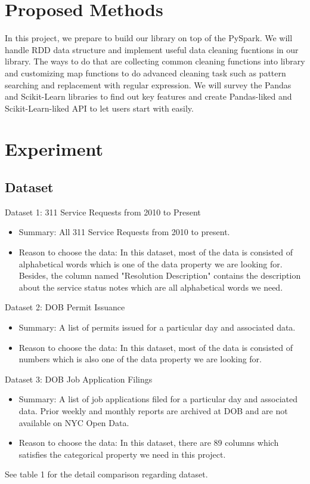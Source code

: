 \documentclass[sigconf]{acmart}
\begin{document}
\section{Proposed Methods}
In this project, we prepare to build our library on top of the PySpark\cite{pyspark, spark}. We will handle RDD data structure and implement useful data cleaning fucntions in our library. The ways to do that are collecting common cleaning functions into library and customizing map functions to do advanced cleaning task such as pattern searching and replacement with regular expression. We will survey the Pandas\cite{pandas} and Scikit-Learn\cite{scikit-learn} libraries to find out key features and create Pandas-liked and Scikit-Learn-liked API to let users start with easily.

\section{Experiment}
\subsection{Dataset}
Dataset 1: 311 Service Requests from 2010 to Present
\begin{itemize}
	\item{Summary: All 311 Service Requests from 2010 to present.}
	\item{Reason to choose the data: In this dataset, most of the data is consisted of alphabetical words which is one of the data property we are looking for. Besides, the column named "Resolution Description" contains the description about the service status notes which are all alphabetical words we need. }
\end{itemize}
Dataset 2: DOB Permit Issuance
\begin{itemize}
	\item{Summary: A list of permits issued for a particular day and associated data.}
	\item{Reason to choose the data: In this dataset, most of the data is consisted of numbers which is also one of the data property we are looking for.}
\end{itemize}
Dataset 3: DOB Job Application Filings
\begin{itemize}
	\item{Summary: A list of job applications filed for a particular day and associated data. Prior weekly and monthly reports are archived at DOB and are not available on NYC Open Data.}
	\item{Reason to choose the data: In this dataset, there are 89 columns which satisfies the categorical property we need in this project.}
	\end{itemize}
	See table 1 for the detail comparison regarding dataset.
\end{document}
